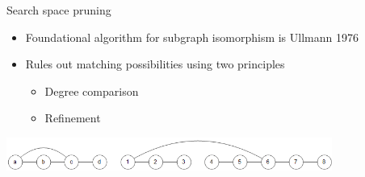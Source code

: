 \documentclass[xcolor=dvipsnames, 14pt]{beamer}
\begin{document}
\begin{frame}[fragile]{Search space pruning}

\begin{itemize}
\item Foundational algorithm for subgraph isomorphism is Ullmann 1976
\pause
\item Rules out matching possibilities using two principles
\pause
\begin{itemize}
\item Degree comparison
\item Refinement 
\end{itemize}
\end{itemize}

\pause
\centering
\scriptsize
\includegraphics[width=0.8\textwidth]{ullmann_demo_cropped.png} 

\begin{center}
\end{center}

\end{frame}
\end{document}
